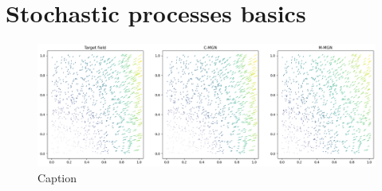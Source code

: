 \chapter{Stochastic processes basics}\label{sec:Stochastic_Processes}
    
\begin{figure}[h]
    \centering
    \includegraphics[width=0.5\linewidth]{images/toy_01.png}
    \caption{Caption}
    \label{fig:toy figure}
\end{figure}

\lipsum[1-2]